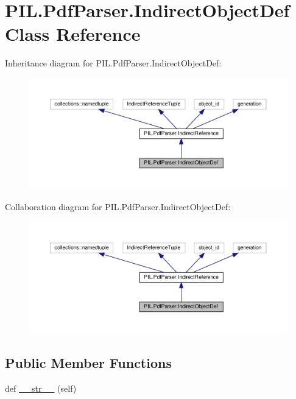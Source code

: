 \hypertarget{classPIL_1_1PdfParser_1_1IndirectObjectDef}{}\section{P\+I\+L.\+Pdf\+Parser.\+Indirect\+Object\+Def Class Reference}
\label{classPIL_1_1PdfParser_1_1IndirectObjectDef}


Inheritance diagram for P\+I\+L.\+Pdf\+Parser.\+Indirect\+Object\+Def\+:
\nopagebreak
\begin{figure}[H]
\begin{center}
\leavevmode
\includegraphics[width=350pt]{classPIL_1_1PdfParser_1_1IndirectObjectDef__inherit__graph}
\end{center}
\end{figure}


Collaboration diagram for P\+I\+L.\+Pdf\+Parser.\+Indirect\+Object\+Def\+:
\nopagebreak
\begin{figure}[H]
\begin{center}
\leavevmode
\includegraphics[width=350pt]{classPIL_1_1PdfParser_1_1IndirectObjectDef__coll__graph}
\end{center}
\end{figure}
\subsection*{Public Member Functions}
\begin{DoxyCompactItemize}
\item 
def \hyperlink{classPIL_1_1PdfParser_1_1IndirectObjectDef_a1f753e6bbf8ccec924c30f998430cb2c}{\+\_\+\+\_\+str\+\_\+\+\_\+} (self)
\end{DoxyCompactItemize}


